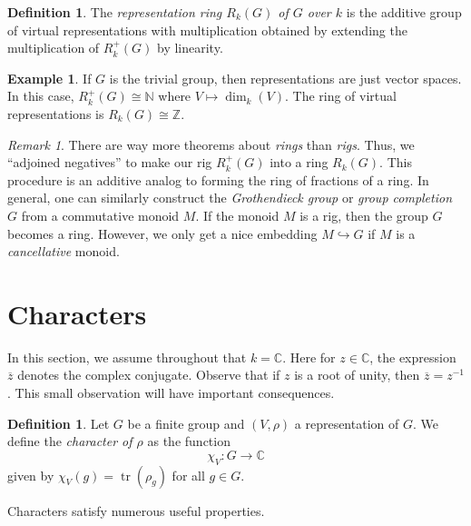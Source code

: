 \documentclass[12pt]{article}
\theoremstyle{plain}
\theoremstyle{definition}
\newtheorem{definition}[theorem]{Definition}
\newtheorem{example}[theorem]{Example}
\theoremstyle{remark}
\newtheorem{remark}[theorem]{Remark}
\numberwithin{equation}{section}
\begin{document}
\begin{definition}
The \emph{representation ring $R_k(G)$ of $G$ over $k$} is
the additive group of virtual representations with multiplication
obtained by extending the multiplication of $R^+_k(G)$ by linearity.
\end{definition}

\begin{example}
If $G$ is the trivial group, then representations are just vector spaces.
In this case, $R^+_k(G) \cong \mathbb{N}$ where $V \mapsto \dim_k(V)$.
The ring of virtual representations is $R_k(G) \cong \mathbb{Z}$.
\end{example}

\begin{remark}
There are way more theorems about \emph{rings} than \emph{rigs}.
Thus, we ``adjoined negatives'' to make our rig $R^+_k(G)$
into a ring $R_k(G)$.
This procedure is an additive analog to forming the ring of fractions of a ring.
In general, one can similarly construct the \emph{Grothendieck group}
or \emph{group completion} $G$ from a commutative monoid $M$.
If the monoid $M$ is a rig, then the group $G$ becomes a ring.
However, we only get a nice embedding $M \hookrightarrow G$ if
$M$ is a \emph{cancellative} monoid.
\end{remark}

\section{Characters}

In this section, we assume throughout that $k=\mathbb{C}$.
Here for $z \in \mathbb{C}$, the expression $\overline{z}$ denotes the
complex conjugate.  Observe that if $z$ is a root of unity, then
$\overline{z}=z^{-1}$.  This small observation will have important
consequences.

\begin{definition}
Let $G$ be a finite group and $(V,\rho)$ a representation of $G$.
We define the \emph{character of $\rho$} as the function
\[
\chi_V : G \to \mathbb{C}
\]
given by $\chi_V(g)=\operatorname{tr}(\rho_g)$ for all $g \in G$. 
\end{definition}

Characters satisfy numerous useful properties.
\end{document}
